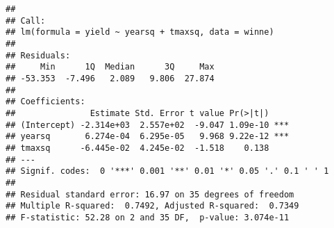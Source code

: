 \documentclass[
]{book}
\newenvironment{Shaded}{\begin{snugshade}}{\end{snugshade}}
\newcommand{\AttributeTok}[1]{\textcolor[rgb]{0.77,0.63,0.00}{#1}}
\newcommand{\FunctionTok}[1]{\textcolor[rgb]{0.00,0.00,0.00}{#1}}
\newcommand{\NormalTok}[1]{#1}
\newcommand{\OtherTok}[1]{\textcolor[rgb]{0.56,0.35,0.01}{#1}}
\newcommand{\SpecialCharTok}[1]{\textcolor[rgb]{0.00,0.00,0.00}{#1}}
\newcommand{\StringTok}[1]{\textcolor[rgb]{0.31,0.60,0.02}{#1}}
\begin{document}
\begin{verbatim}
## 
## Call:
## lm(formula = yield ~ yearsq + tmaxsq, data = winne)
## 
## Residuals:
##     Min      1Q  Median      3Q     Max 
## -53.353  -7.496   2.089   9.806  27.874 
## 
## Coefficients:
##               Estimate Std. Error t value Pr(>|t|)    
## (Intercept) -2.314e+03  2.557e+02  -9.047 1.09e-10 ***
## yearsq       6.274e-04  6.295e-05   9.968 9.22e-12 ***
## tmaxsq      -6.445e-02  4.245e-02  -1.518    0.138    
## ---
## Signif. codes:  0 '***' 0.001 '**' 0.01 '*' 0.05 '.' 0.1 ' ' 1
## 
## Residual standard error: 16.97 on 35 degrees of freedom
## Multiple R-squared:  0.7492, Adjusted R-squared:  0.7349 
## F-statistic: 52.28 on 2 and 35 DF,  p-value: 3.074e-11
\end{verbatim}

\begin{Shaded}
\end{Shaded}
\end{document}
